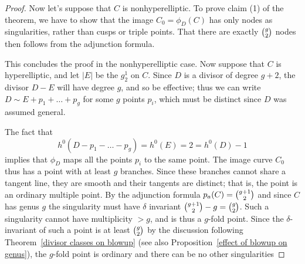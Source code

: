 \begin{proof}
\smallbreak
Now let's suppose that $C$ is nonhyperelliptic.
To prove 
claim (1) of the theorem,
we
have to show  
that the image $C_0 = \phi_D(C)$ 
has only nodes as singularities,
rather than cusps or triple points.
That there are exactly
$\tbinom{g}{2}$ nodes then follows from the 
adjunction formula.
%


\noindent This concludes the proof in the nonhyperelliptic case. Now
suppose that $C$ is hyperelliptic, and let $|E|$ be the  $g^1_2$ on
$C$. 
Since $D$ is a
divisor of degree $g+2$, the divisor $D - E$ will
have degree $g$, and so be effective; thus we can write
$D \sim E + p_1 + \dots + p_g$
for some 
$g$ points $p_i$, which must be distinct since $D$ was assumed general.

The fact that
$$
h^0(D - p_1 - \dots - p_g) = h^0(E) = 2 = h^0(D) - 1
$$
implies that $\phi_D$ maps all the points $p_i$ to the same point. The
image curve $C_0$ thus has a point with at least $g$ branches. Since
these branches cannot share a tangent line,
they are smooth and their tangents are distinct; that is, the point is
an ordinary multiple point. By the adjunction
%
formula $p_a(C) = \tbinom{g+1}{2}$ and since $C$ has genus $g$ the
singularity must have $\delta$ invariant
$\tbinom{g+1}{2} -g = \tbinom{g}{2}$. Such a singularity cannot have
multiplicity $>g$, and is thus a $g$-fold point. Since the
$\delta$-invariant of such a point is at least $\tbinom{g}{2}$ by
the discussion following Theorem~\ref{divisor classes on blowup}
(see also
Proposition~\ref{effect of blowup on genus}), the $g$-fold point is ordinary and there can be no other
singularities
\end{proof}

